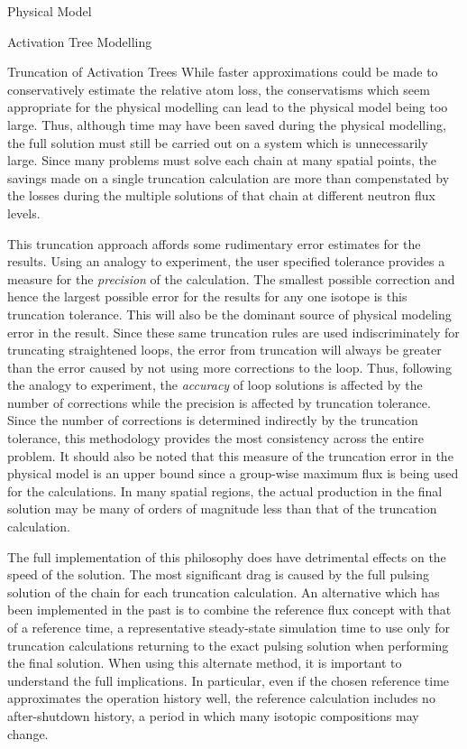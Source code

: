 \begin{chapter}{Physical Model\label{chap:physical}}
\begin{section}{Activation Tree Modelling\label{sec:physical.chains}}
\begin{subsection}{Truncation of Activation Trees}
    While faster approximations could be made to conservatively
    estimate the relative atom loss, the conservatisms which seem
    appropriate for the physical modelling can lead to the physical
    model being too large.  Thus, although time may have been saved
    during the physical modelling, the full solution must still be
    carried out on a system which is unnecessarily large.  Since many
    problems must solve each chain at many spatial points, the savings
    made on a single truncation calculation are more than compenstated
    by the losses during the multiple solutions of that chain at
    different neutron flux levels.
    
    This truncation approach affords some rudimentary error estimates
    for the results.  Using an analogy to experiment, the user
    specified tolerance provides a measure for the \textsl{precision}
    of the calculation.  The smallest possible correction and hence
    the largest possible error for the results for any one isotope is
    this truncation tolerance.  This will also be the dominant source
    of physical modeling error in the result.  Since these same
    truncation rules are used indiscriminately for truncating
    straightened loops, the error from truncation will always be
    greater than the error caused by not using more corrections to the
    loop.  Thus, following the analogy to experiment, the
    \textsl{accuracy} of loop solutions is affected by the number of
    corrections while the precision is affected by truncation
    tolerance.  Since the number of corrections is determined
    indirectly by the truncation tolerance, this methodology provides
    the most consistency across the entire problem.  It should also be
    noted that this measure of the truncation error in the physical
    model is an upper bound since a group-wise maximum flux is being
    used for the calculations.  In many spatial regions, the actual
    production in the final solution may be many of orders of
    magnitude less than that of the truncation calculation.
    
    The full implementation of this philosophy does have detrimental
    effects on the speed of the solution.  The most significant drag
    is caused by the full pulsing solution of the chain for each
    truncation calculation.  An alternative which has been implemented
    in the past is to combine the reference flux concept with that of
    a reference time, a representative steady-state simulation time to
    use only for truncation calculations returning to the exact
    pulsing solution when performing the final solution.  When using
    this alternate method, it is important to understand the full
    implications.  In particular, even if the chosen reference time
    approximates the operation history well, the reference calculation
    includes no after-shutdown history, a period in which many
    isotopic compositions may change.
    

\end{subsection}
\end{section}
\end{chapter}
